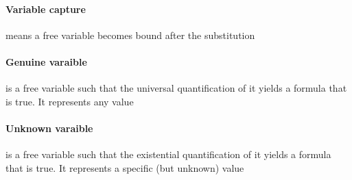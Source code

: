     \paragraph{Variable capture} means a free variable becomes bound after the
    substitution

    \paragraph{Genuine varaible} is a free variable such that the universal
    quantification of it yields a formula that is true. It represents any value

    \paragraph{Unknown varaible} is a free variable such that the existential
    quantification of it yields a formula that is true. It represents a
    specific (but unknown) value

